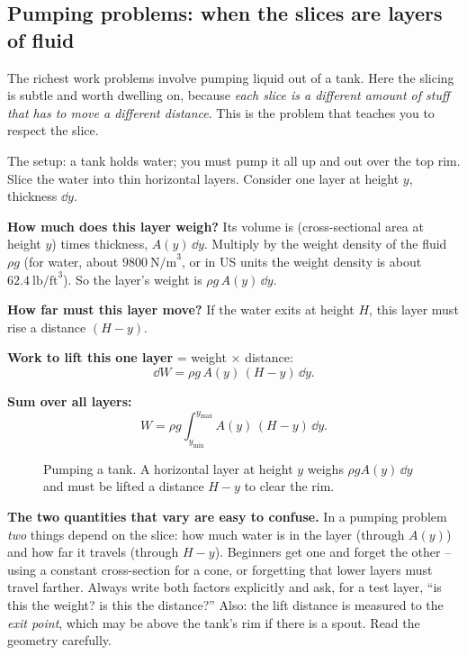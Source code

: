 \subsection{Pumping problems: when the slices are layers of fluid}

The richest work problems involve pumping liquid out of a tank. Here the slicing is
subtle and worth dwelling on, because \emph{each slice is a different amount of
stuff that has to move a different distance}. This is the problem that teaches you
to respect the slice.

The setup: a tank holds water; you must pump it all up and out over the top rim.
Slice the water into thin horizontal layers. Consider one layer at height $y$,
thickness $\dd y$.

\textbf{How much does this layer weigh?} Its volume is (cross-sectional area at
height $y$) times thickness, $A(y)\,\dd y$. Multiply by the weight density of the
fluid $\rho g$ (for water, about $9800\ \text{N/m}^3$, or in US units the weight
density is about $62.4\ \text{lb/ft}^3$). So the layer's weight is
$\rho g\, A(y)\,\dd y$.

\textbf{How far must this layer move?} If the water exits at height $H$, this layer
must rise a distance $(H - y)$.

\textbf{Work to lift this one layer} = weight $\times$ distance:
\[
  \dd W = \rho g\, A(y)\,(H-y)\,\dd y.
\]

\textbf{Sum over all layers:}
\[
  \boxed{\,W = \rho g\int_{y_{\min}}^{y_{\max}} A(y)\,(H-y)\,\dd y.\,}
\]

\begin{figure}[H]
\centering
{}
\caption{Pumping a tank. A horizontal layer at height $y$ weighs $\rho g A(y)\,\dd
y$ and must be lifted a distance $H-y$ to clear the rim.}
\label{ch26:fig-pump}
\end{figure}

\begin{trapbox}
\textbf{The two quantities that vary are easy to confuse.} In a pumping problem
\emph{two} things depend on the slice: how much water is in the layer (through
$A(y)$) and how far it travels (through $H-y$). Beginners get one and forget the
other -- using a constant cross-section for a cone, or forgetting that lower layers
must travel farther. Always write both factors explicitly and ask, for a test
layer, ``is this the weight? is this the distance?'' Also: the lift distance is
measured to the \emph{exit point}, which may be above the tank's rim if there is a
spout. Read the geometry carefully.
\end{trapbox}

